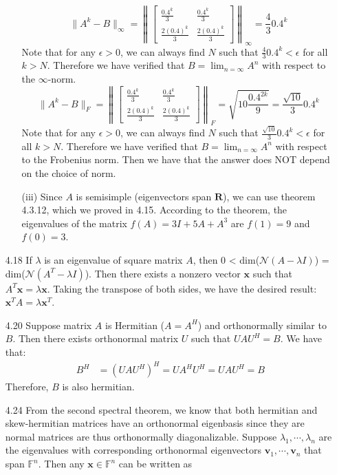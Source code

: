 \documentclass[letterpaper,12pt]{article}
\theoremstyle{definition}
\begin{document}
\begin{enumerate}
\begin{enumerate}
      \[
        \|A^k-B\|_\infty =
        \left\|
        \begin{bmatrix}
          \frac{0.4^k}{3} & \frac{0.4^k}{3} \\
          \frac{2(0.4)^k}{3} & \frac{2(0.4)^k}{3}
        \end{bmatrix}
        \right\|_\infty
        = \frac{4}{3}0.4^k
      \]
      Note that for any $\epsilon > 0$, we can always find $N$ such that $\frac{4}{3}0.4^k < \epsilon$ for all $k > N$. Therefore we have verified that $B = \lim_{n=\infty}A^n$ with respect to the $\infty$-norm.
      \[
        \|A^k-B\|_F =
        \left\|
        \begin{bmatrix}
          \frac{0.4^k}{3} & \frac{0.4^k}{3} \\
          \frac{2(0.4)^k}{3} & \frac{2(0.4)^k}{3}
        \end{bmatrix}
        \right\|_F
        = \sqrt{10\frac{0.4^{2k}}{9}} = \frac{\sqrt{10}}{3}0.4^k
      \]
      Note that for any $\epsilon > 0$, we can always find $N$ such that $\frac{\sqrt{10}}{3}0.4^k < \epsilon$ for all $k > N$. Therefore we have verified that $B = \lim_{n=\infty}A^n$ with respect to the Frobenius norm.
      Then we have that the answer does NOT depend on the choice of norm.
      \item[(iii)]
      Since $A$ is semisimple (eigenvectors span $\mathbf{R}$), we can use theorem 4.3.12, which we proved in 4.15. According to the theorem, the eigenvalues of the matrix $f(A) = 3I+5A+A^3$ are $f(1)=9$ and $f(0)=3$.
    \end{enumerate}
  \item[4.18]
    If $\lambda$ is an eigenvalue of square matrix $A$, then 0 < dim($\mathscr{N}(A-\lambda I)$) = dim($\mathscr{N}(A^T-\lambda I)$). Then there exists a nonzero vector $\mathbf{x}$ such that $A^T\mathbf{x}=\lambda\mathbf{x}$. Taking the transpose of both sides, we have the desired result: $\mathbf{x}^TA=\lambda\mathbf{x}^T$.
  \item[4.20]
    Suppose matrix $A$ is Hermitian ($A = A^H$) and orthonormally similar to $B$. Then there exists orthonormal matrix $U$ such that $UAU^H = B$. We have that:
    \begin{align*}
      B^H &= (UAU^H)^H = UA^HU^H = UAU^H = B
    \end{align*}
    Therefore, $B$ is also hermitian.
  \item[4.24]
    From the second spectral theorem, we know that both hermitian and skew-hermitian matrices have an orthonormal eigenbasis since they are normal matrices are thus orthonormally diagonalizable. Suppose $\lambda_1,\cdots,\lambda_n$ are the eigenvalues with corresponding orthonormal eigenvectors $\mathbf{v}_1,\cdots,\mathbf{v}_n$ that span $\mathbb{F}^n$. Then any $\mathbf{x}\in\mathbb{F}^n$ can be written as

\end{enumerate}
\end{document}
